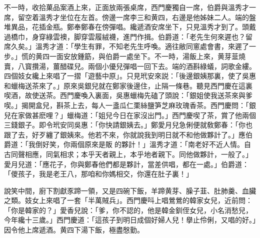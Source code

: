 不一時，收拾菓品案酒上來，正面放兩張桌席，西門慶獨自一席，伯爵與溫秀才一席，留空着溫秀才坐位在左首。傍邊一席李三和黄四，右邊是他姊妹二人。端的盤堆異品，花插金瓶。鄭奉鄭春在傍彈唱。纔遞酒安席坐下，只見溫秀才到了。頭戴過橋巾，身穿綠雲襖，脚穿雲履絨襪，進門作揖。伯爵道：「老先生何來遲也？留席久矣。」溫秀才道：「學生有罪，不知老先生呼喚。適往敝同窻處會書，來遲了一步。」慌的黄四一面安放鍾筯，與伯爵一處坐下。不一時，湯飯上來，黄芽韮燒賣，八寳攢湯，薑醋碟兒。兩個小優兒彈唱一回下去。端的酒斟綠蟻，詞歌金縷。四個妓女纔上來唱了一摺「遊藝中原」。只見玳安來説：「後邊銀姨那裏，使了吳惠和蠟梅送茶來了。」原來吳銀兒就在鄭家後邊住，止隔一條巷。聽見西門慶在這裏喫酒，故使送茶。西門慶喚入裏面，吳惠蠟梅先磕了頭說：「銀姐使我送茶來與爹喫。」揭開盒兒，斟茶上去，每人一盞瓜仁栗絲鹽笋芝麻玫瑰香茶。西門慶問：「銀兒在家做甚麽哩？」蠟梅道：「姐兒今日在家沒出門。」西門慶喫了茶，賞了他兩個三錢銀子。即令玳安同吳惠：「你快請銀姨去。」鄭愛月兒急俐便就敎鄭春：「你也跟了去，好歹纏了銀姨來。他若不來，你就說我到明日就不和他做夥計了。」應伯爵道：「我倒好笑，你兩個原來是販𣭈的夥計！」溫秀才道：「南老好不近人情。自古同聲相應，同氣相求；本乎天者親上，本乎地者親下。同他做夥計，一般了。」愛月兒道：「應花子，你與鄭春他們都是夥計，當差供唱，都在一處。」伯爵道：「儍孩子，我是老王八，那咱和你媽相交，你還在肚子裏！」

說笑中間，廚下割獻豕蹄一領，又是四碗下飯，羊蹄黄芽、臊子韮、肚肺羹、血臟之類。妓女上來唱了一套「半萬賊兵」。西門慶呌上唱鶯鶯的韓家女兒，近前問：「你是韓家的？」愛香兒說：「爹，你不認的，他是韓金釧侄女兒，小名消愁兒，今年纔十三歲。」西門慶道：「這孩子到明日成個好婦人兒！擧止伶俐，又唱的好。」因令他上席遞酒。黄四下湯下飯，極盡慇勤。


